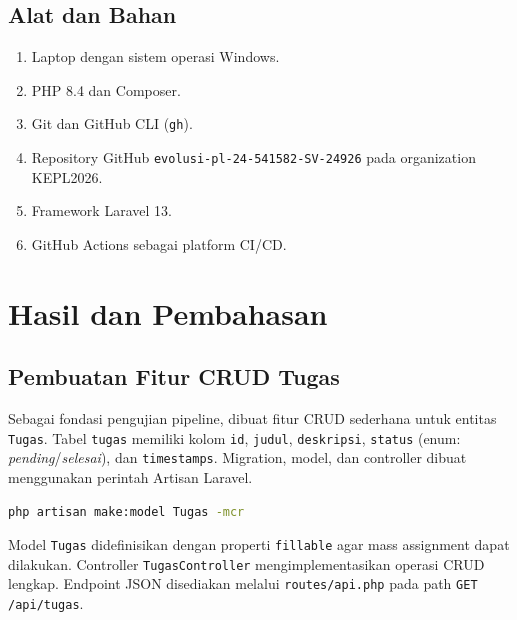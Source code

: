 \documentclass[a4paper,oneside,11pt]{book}
\begin{document}
\section{Alat dan Bahan}
\begin{enumerate}
    \item Laptop dengan sistem operasi Windows.
    \item PHP 8.4 dan Composer.
    \item Git dan GitHub CLI (\texttt{gh}).
    \item Repository GitHub \texttt{evolusi-pl-24-541582-SV-24926} pada organization KEPL2026.
    \item Framework Laravel 13.
    \item GitHub Actions sebagai platform CI/CD.
\end{enumerate}

\chapter{Hasil dan Pembahasan}

\section{Pembuatan Fitur CRUD Tugas}

Sebagai fondasi pengujian pipeline, dibuat fitur CRUD sederhana untuk entitas \texttt{Tugas}. Tabel \texttt{tugas} memiliki kolom \texttt{id}, \texttt{judul}, \texttt{deskripsi}, \texttt{status} (enum: \textit{pending}/\textit{selesai}), dan \texttt{timestamps}. Migration, model, dan controller dibuat menggunakan perintah Artisan Laravel.

\begin{lstlisting}[language=bash, caption={Perintah pembuatan CRUD Tugas}]
php artisan make:model Tugas -mcr
\end{lstlisting}

Model \texttt{Tugas} didefinisikan dengan properti \texttt{fillable} agar mass assignment dapat dilakukan. Controller \texttt{TugasController} mengimplementasikan operasi CRUD lengkap. Endpoint JSON disediakan melalui \texttt{routes/api.php} pada path \texttt{GET /api/tugas}.

\end{document}
